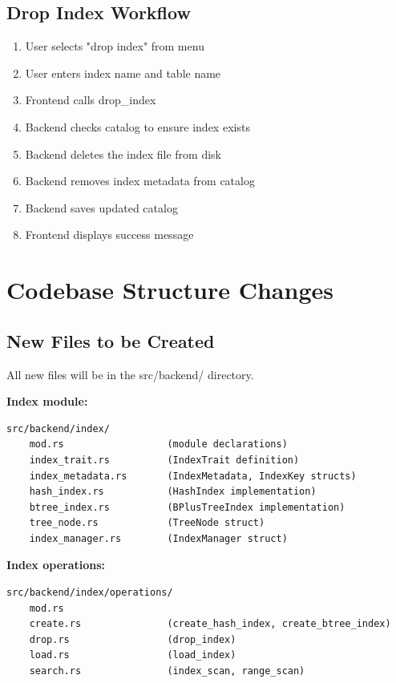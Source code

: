 \documentclass[11pt,a4paper]{article}
\begin{document}
\subsection{Drop Index Workflow}

\begin{enumerate}
\item User selects "drop index" from menu
\item User enters index name and table name
\item Frontend calls drop\_index
\item Backend checks catalog to ensure index exists
\item Backend deletes the index file from disk
\item Backend removes index metadata from catalog
\item Backend saves updated catalog
\item Frontend displays success message
\end{enumerate}

\section{Codebase Structure Changes}

\subsection{New Files to be Created}

All new files will be in the src/backend/ directory.

\textbf{Index module:}
\begin{lstlisting}
src/backend/index/
    mod.rs                  (module declarations)
    index_trait.rs          (IndexTrait definition)
    index_metadata.rs       (IndexMetadata, IndexKey structs)
    hash_index.rs           (HashIndex implementation)
    btree_index.rs          (BPlusTreeIndex implementation)
    tree_node.rs            (TreeNode struct)
    index_manager.rs        (IndexManager struct)
\end{lstlisting}

\textbf{Index operations:}
\begin{lstlisting}
src/backend/index/operations/
    mod.rs
    create.rs               (create_hash_index, create_btree_index)
    drop.rs                 (drop_index)
    load.rs                 (load_index)
    search.rs               (index_scan, range_scan)
\end{lstlisting}
\end{document}
